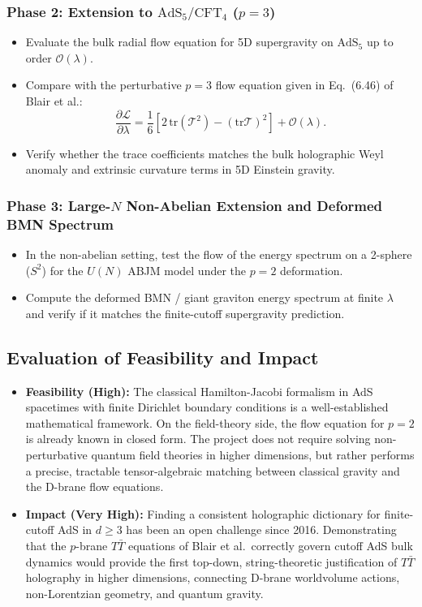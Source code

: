 \documentclass[11pt,a4paper]{article}
\begin{document}
\subsubsection*{Phase 2: Extension to $\text{AdS}_5/\text{CFT}_4$ ($p=3$)}
\begin{itemize}
    \item Evaluate the bulk radial flow equation for 5D supergravity on $\text{AdS}_5$ up to order $\mathcal{O}(\lambda)$.
    \item Compare with the perturbative $p=3$ flow equation given in Eq.~(6.46) of Blair et al.:
    \begin{equation}
        \frac{\partial \mathcal{L}}{\partial \lambda} = \frac{1}{6} \left[ 2\,\mathrm{tr}(\mathcal{T}^2) - (\mathrm{tr}\mathcal{T})^2 \right] + \mathcal{O}(\lambda).
    \end{equation}
    \item Verify whether the trace coefficients matches the bulk holographic Weyl anomaly and extrinsic curvature terms in 5D Einstein gravity.
\end{itemize}

\subsubsection*{Phase 3: Large-$N$ Non-Abelian Extension and Deformed BMN Spectrum}
\begin{itemize}
    \item In the non-abelian setting, test the flow of the energy spectrum on a 2-sphere ($S^2$) for the $U(N)$ ABJM model under the $p=2$ deformation.
    \item Compute the deformed BMN / giant graviton energy spectrum at finite $\lambda$ and verify if it matches the finite-cutoff supergravity prediction.
\end{itemize}

\subsection{Evaluation of Feasibility and Impact}
\begin{itemize}
    \item \textbf{Feasibility (High):} 
    The classical Hamilton-Jacobi formalism in AdS spacetimes with finite Dirichlet boundary conditions is a well-established mathematical framework. On the field-theory side, the flow equation for $p=2$ is already known in closed form. The project does not require solving non-perturbative quantum field theories in higher dimensions, but rather performs a precise, tractable tensor-algebraic matching between classical gravity and the D-brane flow equations.
    
    \item \textbf{Impact (Very High):} 
    Finding a consistent holographic dictionary for finite-cutoff AdS in $d \ge 3$ has been an open challenge since 2016. Demonstrating that the $p$-brane $T\bar{T}$ equations of Blair et al.\ correctly govern cutoff AdS bulk dynamics would provide the first top-down, string-theoretic justification of $T\bar{T}$ holography in higher dimensions, connecting D-brane worldvolume actions, non-Lorentzian geometry, and quantum gravity.
\end{itemize}
\end{document}
